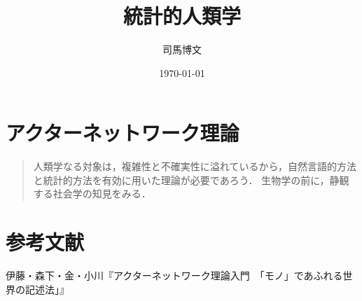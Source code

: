 \documentclass[uplatex,dvipdfmx]{jsreport}
\title{統計的人類学}
\author{司馬博文}
\date{\today}
\begin{document}
\tableofcontents

\chapter{アクターネットワーク理論}

\begin{quotation}
    人類学なる対象は，複雑性と不確実性に溢れているから，自然言語的方法と統計的方法を有効に用いた理論が必要であろう．
    生物学の前に，静観する社会学の知見をみる．
\end{quotation}

\chapter{参考文献}

\begin{thebibliography}{99}
    伊藤・森下・金・小川『アクターネットワーク理論入門　「モノ」であふれる世界の記述法」』
\end{thebibliography}
\end{document}
